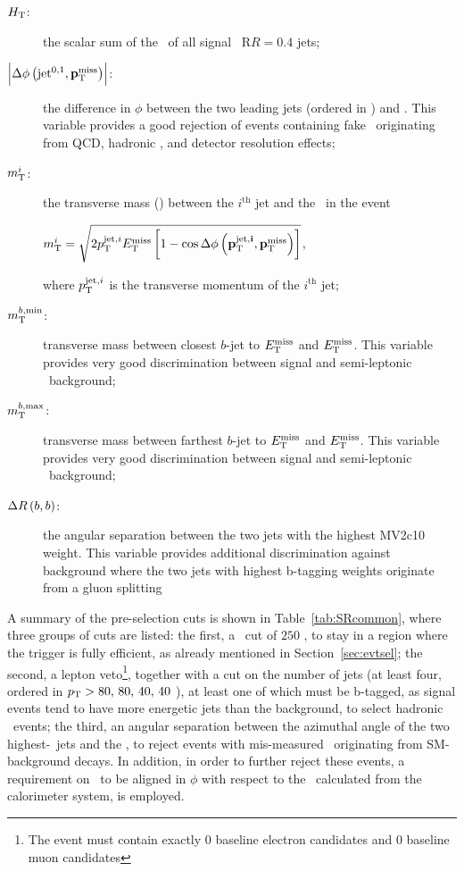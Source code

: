 			\begin{description}
				\item[\boldmath $H_{\mathrm{T}}$:] the scalar sum of the \pt\ of all signal \antikt\ R$R=0.4$ jets;

				\item[$\left|\Delta\phi\left(\mathrm{jet}^{0,1},\mathbf{p}_\mathrm{T}^\mathrm{miss}\right)\right|$:] the difference in $\phi$ between the two leading jets (ordered in \pt) and \ptmiss. This variable provides a good rejection of events containing fake \met\ originating from \ac{QCD}, hadronic \ttbar, and detector resolution effects;

				\item[\boldmath $m_{\mathrm{T}}^{i}$:] the transverse mass (\mt) between the $i^{\mathrm{th}}$ jet and the \met\ in the event\\
				\begin{center}
					$\mtjetimet = \sqrt{2\ptjeti\met\left[1-\cos{\Delta\phi\left(\mathrm{\mathbf{\ptjeti}},\ptmiss\right)}\right]}$,
				\end{center}
				where $p_{\mathrm{T}}^{\mathrm{jet},i}$ is the transverse momentum of the $i^{\mathrm{th}}$ jet;

				\item[\boldmath $m_{\mathrm{T}}^{b,\mathrm{min}}$:] transverse mass between closest $b$-jet to $E_{\mathrm{T}}^{\mathrm{miss}}$ and $E_{\mathrm{T}}^{\mathrm{miss}}$. This variable provides very good discrimination between signal and semi-leptonic \ttbar\ background;

				\item[\boldmath $m_{\mathrm{T}}^{b,\mathrm{max}}$:] transverse mass between farthest $b$-jet to $E_{\mathrm{T}}^{\mathrm{miss}}$ and $E_{\mathrm{T}}^{\mathrm{miss}}$. This variable provides very good discrimination between signal and semi-leptonic \ttbar\ background;
												
				\item[\boldmath $\Delta R\left(b,b\right)$:] the angular separation between the two jets with the highest MV2c10 weight. This variable provides additional discrimination against background where the two jets with highest b-tagging weights originate from a gluon splitting
			\end{description}

			A summary of the pre-selection cuts is shown in Table~\ref{tab:SRcommon}, where three groups of cuts are listed: the first, a \met\ cut of $250$ \GeV, to stay in a region where the trigger is fully efficient, as already mentioned in Section~\ref{sec:evtsel}; the second, a lepton veto\footnote{The event must contain exactly $0$ baseline electron candidates and $0$ baseline muon candidates}, together with a cut on the number of jets (at least four, ordered in $p_{\mathrm{T}} > 80,\,80,\,40,\,40$ \GeV), at least one of which must be b-tagged, as signal events tend to have more energetic jets than the background, to select hadronic \ttbar\ events; the third, an angular separation between the azimuthal angle of the two highest-\pt\ jets and the \ptmiss, to reject events with mis-measured \met\ originating from \ac{SM}-background decays. In addition, in order to further reject these events, a requirement on \ptmisstrk\ to be aligned in $\phi$ with respect to the \ptmiss\ calculated from the calorimeter system, is employed. 

